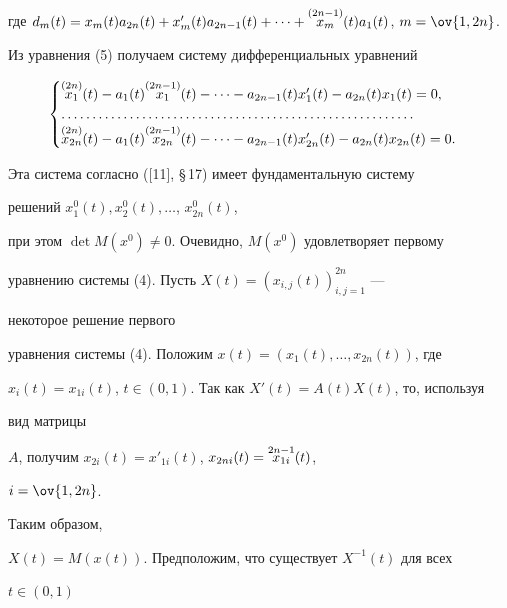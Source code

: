 где $d_m(t)=x_m(t)a_{2n}(t)+x'_m(t)a_{2n-1}(t)+\dotsb+ 


\up{(2n-1)}{x_m}(t)a_1(t)$, $m=\ov{1,2n}$.





Из уравнения (5) получаем систему дифференциальных уравнений


$$


\begin{cases}


\up{(2n)}{x_1}(t)-a_1(t)\up{(2n-1)}{x_1}(t)- \dotsb - a_{2n-1}(t)


x'_1(t)-a_{2n}(t)x_1(t)=0, \\


\dotsc\dotsc\dotsc\dotsc\dotsc\dotsc\dotsc\dotsc


\dotsc\dotsc\dotsc\dotsc\dotsc\dotsc\dotsc\dotsc\dotsc\dotsc\dotsc\\


\up{(2n)}{x_{2n}}(t)-a_1(t)\up{(2n-1)}{x_{2n}}(t)-\dotsb-


a_{2n-1}(t)x'_{2n}(t)-a_{2n}(t)x_{2n}(t)=0.


\end{cases}


$$





Эта система согласно ([11], \S\,17) имеет фундаментальную систему 


решений $x^0_1(t),x^0_2(t),\dotsc$, $x^0_{2n}(t)$,




при этом $\det M(x^0)\ne0$. Очевидно, $M(x^0)$ удовлетворяет первому


уравнению системы (4). Пусть $X(t)=(x_{i,j}(t))^{2n}_{i,j=1}$ --- 


некоторое решение первого


уравнения системы (4). Положим $x(t)=(x_1(t),\dotsc,x_{2n}(t))$, где 


$x_i(t)=x_{1i}(t)$, $t\in(0,1)$. Так как $X'(t)=A(t)X(t)$, то, используя 


вид матрицы


$A$, получим $x_{2i}(t)=x'_{1i}(t)$, $x_{2n i}(t)=\overset{2n-1}{x_{1i}}{}(t)$, 


$i=\ov{1,2n}$.


Таким образом,


$X(t)=M(x(t))$. Предположим, что существует $X^{-1}(t)$ для всех 


$t\in(0,1)$


